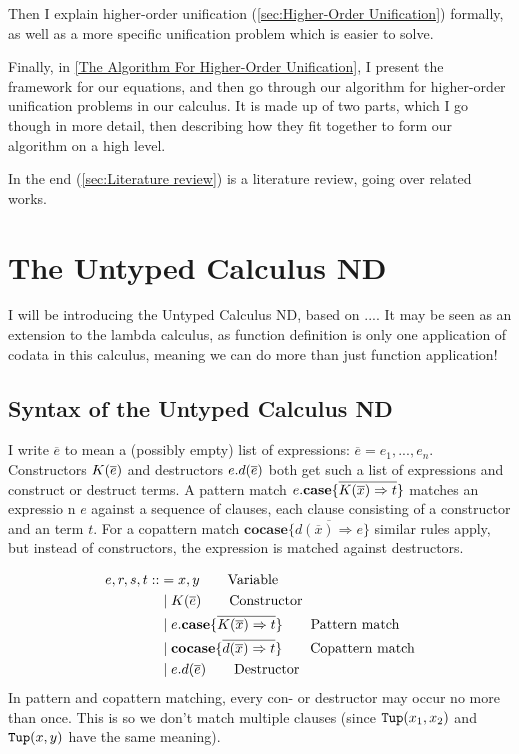 \documentclass[twoside,12pt,a4paper]{article}
\begin{document}
Then I explain higher-order unification (\ref{sec:Higher-Order Unification}) formally, as well as a more specific unification problem which is easier to solve.

Finally, in \ref{The Algorithm For Higher-Order Unification}, I present the framework for our equations, 
and then go through our algorithm for higher-order unification problems in our calculus.
It is made up of two parts, which I go though in more detail, 
then describing how they fit together to form our algorithm on a high level.

In the end (\ref{sec:Literature review}) is a literature review, going over related works.

\section{The Untyped Calculus ND}\label{sec:The Untyped Calculus ND}

I will be introducing the Untyped Calculus ND, based on .... %
It may be seen as an extension to the lambda calculus, as function definition is only one application of codata in this calculus,
meaning we can do more than just function application! 

\subsection{Syntax of the Untyped Calculus ND}\label{sec:syntax}

I write $\overline{e}$ to mean a (possibly empty) list of expressions: $\overline{e}= e_1, ..., e_n$.  
Constructors $K(\overline{e})$ and destructors $e.d(\overline{e})$ both get such a list of expressions and construct or destruct terms.
A pattern match $e.\textbf{case}\{\overline{K(\overline{x})\Rightarrow t}\}$ matches an expressio n $e$ against a sequence of clauses, each clause consisting of a constructor and an term $t$.
For a copattern match $\textbf{cocase} \{\overline{d(\overline{x}) \Rightarrow e}\}$
similar rules apply, but instead of constructors, the expression is matched against destructors.

\begin{definition}
    \begin{align*}
    e,r,s,t ::&=  x,y  \tag*{Variable} \\
        &\;|\;K(\overline{e}) \tag*{Constructor} \\
        &\;|\;e.\textbf{case}\{\overline{K(\overline{x})\Rightarrow t}\}  \tag*{Pattern match}\\
        &\;|\;\textbf{cocase}\{\overline{d(\overline{x})\Rightarrow t}\}  \tag*{Copattern match}\\
        &\;|\;e.d(\overline{e})  \tag*{Destructor}
    \end{align*}
    In pattern and copattern matching, every con- or destructor may occur no more than once.
    This is so we don't match multiple clauses (since $\mathtt{Tup(}x_1, x_2\mathtt{)}$ and $\mathtt{Tup(}x, y\mathtt{)}$ have the same meaning). %
\end{definition}
\iffalse$x, y \in$ \textsc{Var}, $\constructor \in$\textsc{CtorDtorName} $\lor$ \textsc{TypeName}, $\destructor \in$\textsc{CtorDtorName}.
\fi %
\end{document}

